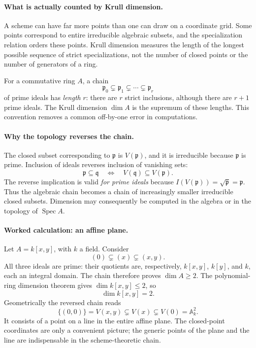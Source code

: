 \paragraph{What is actually counted by Krull dimension.}
A scheme can have far more points than one can draw on a coordinate grid.
Some points correspond to entire irreducible algebraic subsets, and the
specialization relation orders these points.  Krull dimension measures the
length of the longest possible sequence of strict specializations, not the
number of closed points or the number of generators of a ring.

For a commutative ring \(A\), a chain
\[
 \mathfrak p_0\subsetneq\mathfrak p_1\subsetneq\cdots
 \subsetneq\mathfrak p_r
\]
of prime ideals has \emph{length} \(r\): there are \(r\) strict
inclusions, although there are \(r+1\) prime ideals.  The Krull
dimension \(\dim A\) is the supremum of these lengths.  This
convention removes a common off-by-one error in computations.

\paragraph{Why the topology reverses the chain.}
The closed subset corresponding to \(\mathfrak p\) is
\(V(\mathfrak p)\), and it is irreducible because \(\mathfrak p\)
is prime.  Inclusion of ideals reverses inclusion of vanishing sets:
\[
 \mathfrak p\subseteq\mathfrak q
 \quad\Longleftrightarrow\quad
 V(\mathfrak q)\subseteq V(\mathfrak p).
\]
The reverse implication is valid \emph{for prime ideals} because
\(I(V(\mathfrak p))=\sqrt{\mathfrak p}=\mathfrak p\).
Thus the algebraic chain becomes a chain of increasingly smaller
irreducible closed subsets.  Dimension may consequently be computed
in the algebra or in the topology of \(\operatorname{Spec}A\).

\paragraph{Worked calculation: an affine plane.}
Let \(A=k[x,y]\), with \(k\) a field.  Consider
\[
 (0)\subsetneq(x)\subsetneq(x,y).
\]
All three ideals are prime: their quotients are, respectively,
\(k[x,y]\), \(k[y]\), and \(k\), each an integral domain.
The chain therefore proves \(\dim A\ge 2\).  The polynomial-ring
dimension theorem gives \(\dim k[x,y]\le 2\), so
\[
 \boxed{\dim k[x,y]=2.}
\]
Geometrically the reversed chain reads
\[
 \{(0,0)\}=V(x,y)\subsetneq V(x)\subsetneq
 V(0)=\mathbb A^2_k.
\]
It consists of a point on a line in the entire affine plane.
The closed-point coordinates are only a convenient picture; the
generic points of the plane and the line are indispensable in the
scheme-theoretic chain.

